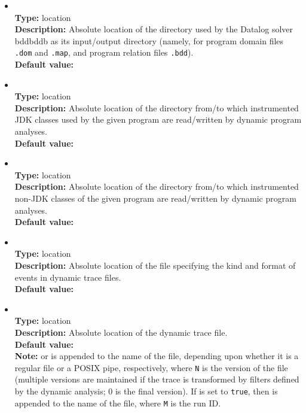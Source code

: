 \begin{itemize}
\item
{} \\
{\bf Type:} location \\
{\bf Description:} Absolute location of the directory used by the Datalog solver bddbddb as its input/output directory (namely, for program domain files {\tt *.dom} and {\tt *.map}, and program relation files {\tt *.bdd}). \\
{\bf Default value:} 

\item
{} \\
{\bf Type:} location \\
{\bf Description:} Absolute location of the directory from/to which instrumented JDK classes used by the given program are read/written by dynamic program analyses. \\
{\bf Default value:}  

\item
{} \\
{\bf Type:} location \\
{\bf Description:} Absolute location of the directory from/to which instrumented non-JDK classes of the given program are read/written by dynamic program analyses. \\
{\bf Default value:}  

\item
{} \\
{\bf Type:} location \\
{\bf Description:} Absolute location of the file specifying the kind and format of events in dynamic trace files. \\
{\bf Default value:} 

\item
{} \\
{\bf Type:} location \\
{\bf Description:} Absolute location of the dynamic trace file. \\
{\bf Default value:}   \\
{\bf Note:}  or  is appended to the name of the file, depending upon whether it is a regular file or a POSIX pipe, respectively, where {\tt N} is the version of the file (multiple versions are maintained if the trace is transformed by filters defined by the dynamic analysis; 0 is the final version).  If  is set to {\tt true}, then  is appended to the name of the file, where {\tt M} is the run ID.
\end{itemize}

